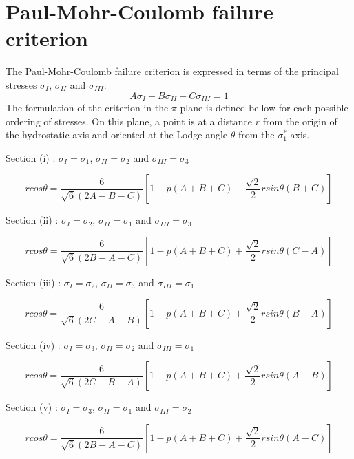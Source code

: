 \section*{Paul-Mohr-Coulomb failure criterion}
The Paul-Mohr-Coulomb failure criterion is expressed in terms of the principal stresses $\sigma_I$, $\sigma_{II}$ and $\sigma_{III}$:
\begin{equation}
    A \sigma_I + B \sigma_{II} + C \sigma_{III} = 1
\end{equation}
The formulation of the criterion in the $\pi$-plane is defined bellow for each possible ordering of stresses. On this plane, a point is at a distance $r$ from the origin of the hydrostatic axis and oriented at the Lodge angle $\theta$ from the  $\sigma_1^*$ axis.

Section (i) : $\sigma_I = \sigma_1$, $\sigma_{II} = \sigma_2$ and $\sigma_{III} = \sigma_3$

\begin{equation}
    r cos\theta = \frac{6}{\sqrt{6}(2A-B-C)} \left[ 1-p(A+B+C)- \frac{\sqrt{2}}{2} r sin \theta (B+C) \right]
\end{equation}

Section (ii) : $\sigma_I = \sigma_2$, $\sigma_{II} = \sigma_1$ and $\sigma_{III} = \sigma_3$

\begin{equation}
    r cos\theta = \frac{6}{\sqrt{6}(2B-A-C)} \left[ 1-p(A+B+C)+ \frac{\sqrt{2}}{2} r sin \theta (C-A) \right]
\end{equation}

Section (iii) : $\sigma_I = \sigma_2$, $\sigma_{II} = \sigma_3$ and $\sigma_{III} = \sigma_1$

\begin{equation}
    r cos\theta = \frac{6}{\sqrt{6}(2C-A-B)} \left[ 1-p(A+B+C)+ \frac{\sqrt{2}}{2} r sin \theta (B-A) \right]
\end{equation}

Section (iv) : $\sigma_I = \sigma_3$, $\sigma_{II} = \sigma_2$ and $\sigma_{III} = \sigma_1$

\begin{equation}
    r cos\theta = \frac{6}{\sqrt{6}(2C-B-A)} \left[ 1-p(A+B+C)+ \frac{\sqrt{2}}{2} r sin \theta (A-B) \right]
\end{equation}

Section (v) : $\sigma_I = \sigma_3$, $\sigma_{II} = \sigma_1$ and $\sigma_{III} = \sigma_2$

\begin{equation}
    r cos\theta = \frac{6}{\sqrt{6}(2B-A-C)} \left[ 1-p(A+B+C)+ \frac{\sqrt{2}}{2} r sin \theta (A-C) \right]
\end{equation}


